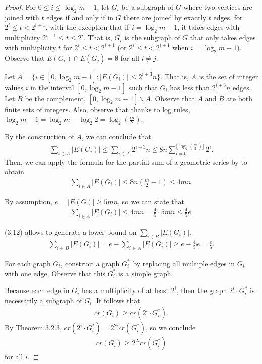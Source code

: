 \documentclass{scrippsthesisclass}
\theoremstyle{definition}
\begin{document}
\begin{proof}
For $0 \leq i \leq \log_2 m - 1$, let $G_i$ be a subgraph of $G$ where two vertices are joined with $t$ edges if and only if in $G$ there are joined by exactly $t$ edges, for $2^i \leq t < 2^{i+1}$, with the exception that if $i = \log_2 m - 1$, it takes edges with multiplicity $2^{i - 1} \leq t \leq 2^{i}$. 
That is, $G_i$ is the subgraph of $G$ that only takes edges with multiplicity $t$ for $2^i \leq t < 2^{i+1}$ (or $2^i \leq t < 2^{i + 1}$ when $i = \log_2 m - 1)$. 
Observe that $E(G_i) \cap E(G_j) = \emptyset$ for all $i \neq j$. 

Let $A = \{i \in [0, \log_2 m - 1]: |E(G_i)| \leq 2^{i + 3}n \}$. That is, $A$ is the set of integer values $i$ in the interval $[0, \log_2 m - 1]$ such that $G_i$ has less than $2^{i + 3}n$ edges.
Let $B$ be the complement, $[0, \log_2 m - 1] \backslash A$. 
Observe that $A$ and $B$ are both finite sets of integers. 
Also, observe that thanks to log rules, $\log_2 m - 1 = \log_2 m - \log_2 2 = \log_2 \left(\frac{m}{2}\right)$.
 
By the construction of $A$, we can conclude that 
\begin{align}
\sum_{i \in A} | E(G_i)| \leq \sum_{i \in A} 2^{i + 3}n \leq 8n \sum_{i = 0}^{\lfloor \log_2 \left(\frac{m}{2}\right) \rfloor} 2^{i}.
\end{align}
Then, we can apply the formula for the partial sum of a geometric series by to obtain
\begin{align}
    \sum_{i \in A} | E(G_i)| \leq 8n \left(\frac{m}{2} - 1\right) \leq 4mn.
\end{align}

By assumption, $e = |E(G)| \geq 5mn$, so we can state that
\begin{align}
    \sum_{i \in A} |E(G_i)| \leq 4mn = \frac{4}{5} \cdot 5mn \leq \frac{4}{5} e.
\end{align}

(3.12) allows to generate a lower bound on $\sum \limits_{i \in B} |E(G_i)|$.  
\begin{align}
\sum_{i \in B} |E(G_i)| = e - \sum_{i \in A}|E(G_i)| \geq e - \frac{4}{5}e = \frac{e}{5}. 
\end{align}

For each graph $G_i$, construct a graph $G_i^*$ by replacing all multiple edges in $G_i$ with one edge. 
Observe that this $G_i^*$ is a simple graph. 

Because each edge in $G_i$ has a multiplicity of at least $2^i$, then the graph $2^i \cdot G_i^*$ is necessarily a subgraph of $G_i$.
It follows that
\begin{align}
    cr(G_i) \geq cr(2^{i} \cdot G_i^*). 
\end{align}
By Theorem 3.2.3, $cr(2^{i} \cdot G_i^*) = 2^{2i} cr(G_i^*)$, so we conclude
\begin{align}
    cr(G_i) \geq  2^{2i} cr(G_i^*)
\end{align}
for all $i$. 


\end{proof}
\end{document}
